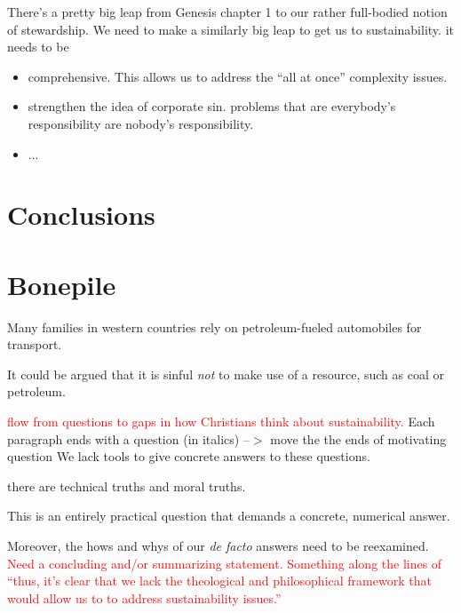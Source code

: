 \documentclass[12pt]{article}
\newcommand{\ins}[1]{\textcolor{red}{#1}}
\begin{document}
There's a pretty big leap from Genesis chapter 1 to our rather full-bodied notion of stewardship.
We need to make a similarly big leap to get us to sustainability.
it needs to be 
\begin{itemize}
\item comprehensive. This allows us to address the ``all at once'' complexity issues. 
\item strengthen the idea of corporate sin. problems that are everybody's responsibility are nobody's responsibility.
\item ...
\end{itemize}









\section{Conclusions}
\label{sec:conclusions}



\section{Bonepile}


Many families in western countries rely on petroleum-fueled automobiles for transport.

It could be argued that it is sinful \emph{not} to make use of a resource, such as coal or petroleum. 

\ins{flow from questions to gaps in how Christians think about sustainability.}
Each paragraph ends with a question (in italics)
--$>$ move the the ends of motivating question
 We lack tools to give concrete answers to these questions.

there are technical truths and moral truths. 

This is an entirely practical question that demands a concrete, numerical answer.

Moreover, the hows and whys of our \emph{de facto} answers need to be reexamined.
\ins{Need a concluding and/or summarizing statement. Something along the lines of ``thus, it's clear that we lack the theological
and philosophical framework that would allow us to to address sustainability issues.''}
\end{document}
